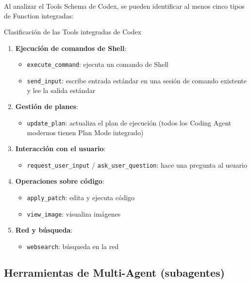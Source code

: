 \documentclass[a4paper]{article}
\begin{document}
Al analizar el Tools Schema de Codex, se pueden identificar al menos cinco tipos de Function integradas:

\begin{importantbox}{Clasificación de las Tools integradas de Codex}
\begin{enumerate}
    \item \textbf{Ejecución de comandos de Shell}:
    \begin{itemize}
        \item \texttt{execute\_command}: ejecuta un comando de Shell
        \item \texttt{send\_input}: escribe entrada estándar en una sesión de comando existente y lee la salida estándar
    \end{itemize}
    \item \textbf{Gestión de planes}:
    \begin{itemize}
        \item \texttt{update\_plan}: actualiza el plan de ejecución (todos los Coding Agent modernos tienen Plan Mode integrado)
    \end{itemize}
    \item \textbf{Interacción con el usuario}:
    \begin{itemize}
        \item \texttt{request\_user\_input} / \texttt{ask\_user\_question}: hace una pregunta al usuario
    \end{itemize}
    \item \textbf{Operaciones sobre código}:
    \begin{itemize}
        \item \texttt{apply\_patch}: edita y ejecuta código
        \item \texttt{view\_image}: visualiza imágenes
    \end{itemize}
    \item \textbf{Red y búsqueda}:
    \begin{itemize}
        \item \texttt{websearch}: búsqueda en la red
    \end{itemize}
\end{enumerate}
\end{importantbox}

\subsection{Herramientas de Multi-Agent (subagentes)}
\end{document}
